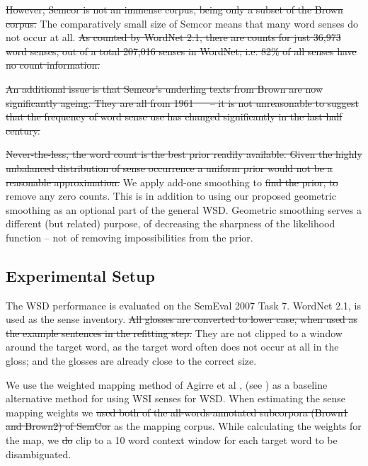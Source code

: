 \documentclass{article} %
\def\parencite{\cite} %
\providecommand{\DIFadd}[1]{{\protect\color{blue}\uwave{#1}}} %
\providecommand{\DIFdel}[1]{{\protect\color{red}\sout{#1}}}                      %
\providecommand{\DIFaddbegin}{} %
\providecommand{\DIFaddend}{} %
\providecommand{\DIFdelbegin}{} %
\providecommand{\DIFdelend}{} %
\begin{document}
\DIFdel{However, Semcor is not an immense corpus, being only a subset of the Brown corpus. }\DIFdelend The comparatively small size of Semcor means that many word senses do not occur at all.
\DIFdelbegin \DIFdel{As counted by WordNet 2.1, there are counts for just  36,973 word senses, out of a total 207,016 senses in WordNet; i.e. 82\% of all senses have no count information.
}%

\DIFdel{An additional issue is that Semcor's underling texts from Brown are now significantly ageing. They are all from 1961 \mbox{%
\cite{francis1979brown} }%
-- it is not unreasonable to suggest that the frequency of word sense use has changed significantly in the last half century.
}%

\DIFdel{Never-the-less, the word count is the best prior readily available. Given the highly unbalanced distribution of sense occurrence a uniform prior would not be a reasonable approximation.
}\DIFdelend We apply add-one smoothing to \DIFdelbegin \DIFdel{find the prior, to }\DIFdelend remove any zero counts.
This is in addition to using our proposed geometric smoothing as an optional part of the general WSD.
Geometric smoothing serves a different (but related) purpose, of decreasing the sharpness of the likelihood function -- not of removing impossibilities from the prior.

\subsection {Experimental Setup}
The WSD performance is evaluated on the SemEval 2007 Task 7. 
WordNet 2.1, is used as the sense inventory.
\DIFdelbegin \DIFdel{All glosses are converted to lower case, when used as the example sentences in the refitting step. 
}\DIFdelend They are not clipped to a window around the target word, as the target word often does not occur at all in the gloss; and the glosses are already close to the correct size.

We use the weighted mapping method of Agirre et al \DIFdelbegin %
\DIFdelend \DIFaddbegin {}\DIFaddend , (see ) as a baseline alternative method for using WSI senses for WSD.
When estimating the sense mapping weights we \DIFdelbegin \DIFdel{used both of the all-words-annotated subcorpora (Brown1 and Brown2) of SemCor }\DIFdelend \DIFaddbegin \DIFadd{use Semcor }\DIFaddend as the mapping corpus.
While calculating the weights for the map, we \DIFdelbegin \DIFdel{do }\DIFdelend clip to a 10 word context window for each target word to be disambiguated.
\end{document}
